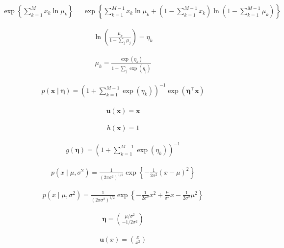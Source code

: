 \documentclass{article}
\begin{document}
\begin{align*}
\exp \left\{ \sum_{k=1}^{M} x_k \ln \mu_k \right\} = \exp \left\{ \sum_{k=1}^{M-1} x_k \ln \mu_k + \left( 1 - \sum_{k=1}^{M-1} x_k \right) \ln \left( 1 - \sum_{k=1}^{M-1} \mu_k \right) \right\} 
\tag{3.155}
\end{align*}

\begin{align*}
\ln \left( \frac{\mu_k}{1 - \sum_j \mu_j} \right) = \eta_k 
\tag{3.156}
\end{align*}

\begin{align*}
\mu_k = \frac{\exp(\eta_k)}{1 + \sum_j \exp(\eta_j)} 
\tag{3.157}
\end{align*}

\begin{align*}
p(\mathbf{x} \mid \boldsymbol{\eta}) = \left( 1 + \sum_{k=1}^{M-1} \exp(\eta_k) \right)^{-1} \exp \left( \boldsymbol{\eta}^{\top} \mathbf{x} \right) 
\tag{3.158}
\end{align*}

\begin{align*}
\mathbf{u}(\mathbf{x}) = \mathbf{x} 
\tag{3.159}
\end{align*}

\begin{align*}
h(\mathbf{x}) = 1 
\tag{3.160}
\end{align*}

\begin{align*}
g(\boldsymbol{\eta}) = \left( 1 + \sum_{k=1}^{M-1} \exp(\eta_k) \right)^{-1} 
\tag{3.161}
\end{align*}

\begin{align*}
p(x \mid \mu, \sigma^2) = \frac{1}{\left( 2\pi \sigma^2 \right)^{1/2}} \exp \left\{ -\frac{1}{2\sigma^2} (x - \mu)^2 \right\} 
\tag{3.162}
\end{align*}

\begin{align*}
p(x \mid \mu, \sigma^2) = \frac{1}{\left( 2\pi \sigma^2 \right)^{1/2}} \exp \left\{ -\frac{1}{2\sigma^2} x^2 + \frac{\mu}{\sigma^2} x - \frac{1}{2\sigma^2} \mu^2 \right\} 
\tag{3.163}
\end{align*}

\begin{align*}
\boldsymbol{\eta} = \binom{\mu / \sigma^2}{-1 / 2\sigma^2} 
\tag{3.164}
\end{align*}

\begin{align*}
\mathbf{u}(x) = \binom{x}{x^2} 
\tag{3.165}
\end{align*}
\end{document}
